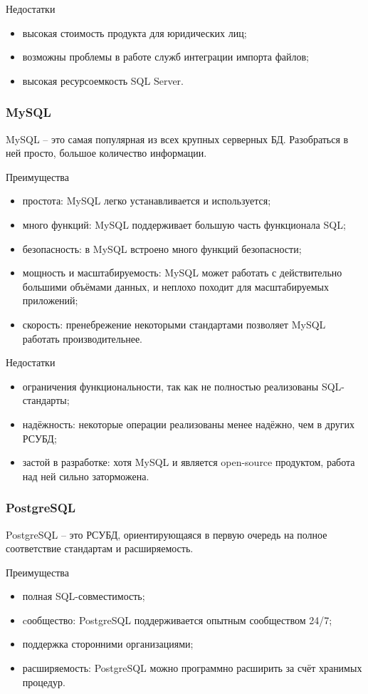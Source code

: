 Недостатки
\begin{itemize}
\item высокая стоимость продукта для юридических лиц;
\item возможны проблемы в работе служб интеграции импорта файлов;
\item высокая ресурсоемкость SQL Server.
\end{itemize}

\subsubsection{\textbf{MySQL}}

MySQL -- это самая популярная из всех крупных серверных БД. Разобраться в ней просто, большое количество информации. 

Преимущества
\begin{itemize}
\item простота: MySQL легко устанавливается и используется;
\item много функций: MySQL поддерживает большую часть функционала SQL;
\item безопасность: в MySQL встроено много функций безопасности;
\item мощность и масштабируемость: MySQL может работать с действительно большими объёмами данных, и неплохо походит для масштабируемых приложений;
\item скорость: пренебрежение некоторыми стандартами позволяет MySQL работать производительнее.
\end{itemize}

Недостатки
\begin{itemize}
\item ограничения функциональности, так как не полностью реализованы SQL-стандарты;
\item надёжность: некоторые операции реализованы менее надёжно, чем в других РСУБД;
\item застой в разработке: хотя MySQL и является open-source продуктом, работа над ней сильно заторможена.
\end{itemize}

\subsubsection{\textbf{PostgreSQL}}

PostgreSQL -- это РСУБД, ориентирующаяся в первую очередь на полное соответствие стандартам и расширяемость.

Преимущества
\begin{itemize}
\item полная SQL-совместимость;
\item cообщество: PostgreSQL поддерживается опытным сообществом 24/7;
\item поддержка сторонними организациями;
\item расширяемость: PostgreSQL можно программно расширить за счёт хранимых процедур. 
\end{itemize}

